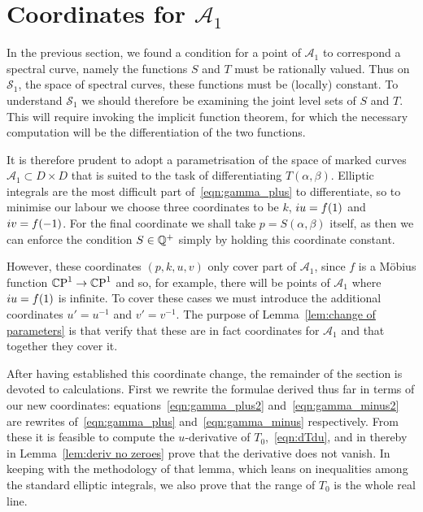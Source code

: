 \section{Coordinates for \texorpdfstring{$\mathcal{A}_1$}{A1}}
\label{sec:Reformulate}

In the previous section, we found a condition for a point of $\mathcal{A}_1$ to correspond a spectral curve, namely the functions $S$ and $T$ must be rationally valued. Thus on $\mathcal{S}_1$, the space of spectral curves, these functions must be (locally) constant. To understand $\mathcal{S}_1$ we should therefore be examining the joint level sets of $S$ and $T$. This will require invoking the implicit function theorem, for which the necessary computation will be the differentiation of the two functions.

It is therefore prudent to adopt a parametrisation of the space of marked curves $\mathcal{A}_1 \subset D\times D$ that is suited to the task of differentiating $T(α,β)$.
Elliptic integrals are the most difficult part of~\eqref{eqn:gamma_plus} to differentiate, so to minimise our labour we choose three coordinates to be $k$, $i u = f(1)$ and $i v = f(-1)$. For the final coordinate we shall take $p=S(α,β)$ itself, as then we can enforce the condition $S\in\Q^+$ simply by holding this coordinate constant.

However, these coordinates $(p,k,u,v)$ only cover part of $\mathcal{A}_1$, since $f$ is a Möbius function $\CP^1 \to \CP^1$ and so, for example, there will be points of $\mathcal{A}_1$ where $i u = f(1)$ is infinite. To cover these cases we must introduce the additional coordinates $u' = u^{-1}$ and $v' = v^{-1}$. The purpose of Lemma~\ref{lem:change of parameters} is that verify that these are in fact coordinates for $\mathcal{A}_1$ and that together they cover it.

After having established this coordinate change, the remainder of the section is devoted to calculations. First we rewrite the formulae derived thus far in terms of our new coordinates: equations~\eqref{eqn:gamma_plus2} and~\eqref{eqn:gamma_minus2} are rewrites of~\eqref{eqn:gamma_plus} and~\eqref{eqn:gamma_minus} respectively. From these it is feasible to compute the $u$-derivative of $T_0$,~\eqref{eqn:dTdu}, and in thereby in Lemma~\ref{lem:deriv no zeroes} prove that the derivative does not vanish. In keeping with the methodology of that lemma, which leans on inequalities among the standard elliptic integrals, we also prove that the range of $T_0$ is the whole real line.

